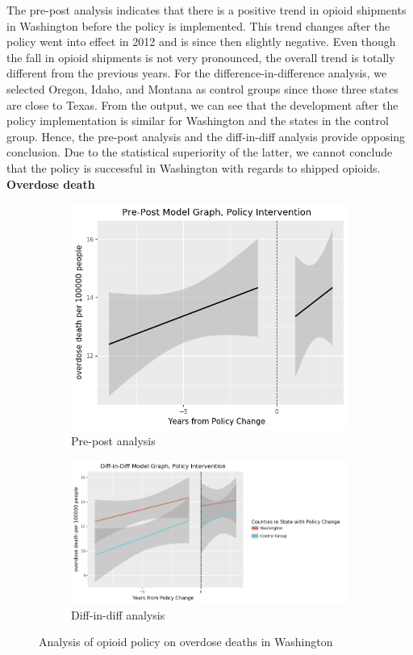 \documentclass[12pt,letterpaper]{article}
\begin{document}
The pre-post analysis indicates that there is a positive trend in opioid shipments in Washington before the policy is implemented. This trend changes after the policy went into effect in 2012 and is since then slightly negative. Even though the fall in opioid shipments is not very pronounced, the overall trend is totally different from the previous years. For the difference-in-difference analysis, we selected Oregon, Idaho, and Montana as control groups since those three states are close to Texas. From the output, we can see that the development after the policy implementation is similar for Washington and the states in the control group. Hence, the pre-post analysis and the diff-in-diff analysis provide opposing conclusion. Due to the statistical superiority of the latter, we cannot conclude that the policy is successful in Washington with regards to shipped opioids. \\

\noindent \textbf{Overdose death}

\begin{figure}[!h]
\centering
\begin{subfigure}{.5\textwidth}
  \centering
  \includegraphics[width=0.7\linewidth]{../30_results/General_Results/washington_overdose_death_prepost.png}
  \caption{Pre-post analysis}
  \label{fig:wa_death_prepost}
\end{subfigure}%
\begin{subfigure}{.55\textwidth}
  \centering
  \includegraphics[width=1\linewidth]{../30_results/General_Results/washington_overdose_death_diffdiff.png}
  \caption{Diff-in-diff analysis}
  \label{fig:wa_death_did}
\end{subfigure}
\caption{Analysis of opioid policy on overdose deaths in Washington}
\label{fig:wa_death}
\end{figure}
\end{document}
